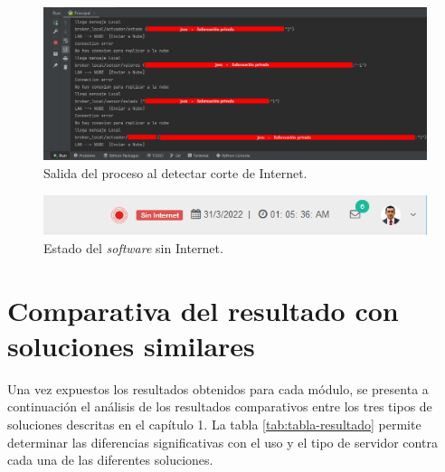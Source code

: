 \begin{figure}[htpb]
\centering 
\includegraphics[width=1.0\textwidth]{./Figures/test/replicador/desconexion3.png}
\caption{Salida del proceso al detectar corte de Internet.}
\label{fig:inter1}
\end{figure}
\vspace{0.25cm}
\begin{figure}[htpb]
\centering 
\includegraphics[width=1.0\textwidth]{./Figures/test/replicador/desconexion2.png}
\caption{Estado del \emph{software} sin Internet.}
\label{fig:inter3}
\end{figure}


\section{Comparativa del resultado con soluciones similares}

Una vez expuestos los resultados obtenidos para cada módulo, se presenta a continuación el análisis de los resultados comparativos entre los tres tipos de soluciones descritas en el capítulo 1. La tabla \ref{tab:tabla-resultado} permite determinar las diferencias significativas con el uso y el tipo de servidor contra cada una de las diferentes soluciones.

